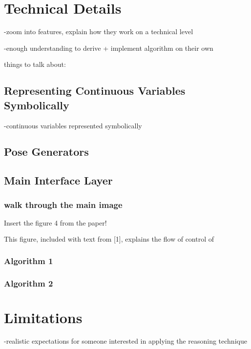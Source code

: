 \documentclass[12pt]{article}
\begin{document}
\section{Technical Details}

-zoom into features, explain how they work on a technical level

-enough understanding to derive + implement algorithm on their own

things to talk about:

\subsection{Representing Continuous Variables Symbolically}



-continuous variables represented symbolically


\subsection{Pose Generators}


\subsection{Main Interface Layer}

\subsubsection{walk through the main image}

Insert the figure 4 from the paper!

This figure, included with text from [1], explains the flow of control of 

\subsubsection{Algorithm 1}

\subsubsection{Algorithm 2}


\section{Limitations}

-realistic expectations for someone interested in applying the reasoning technique
\end{document}
